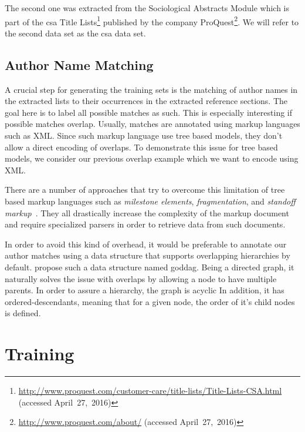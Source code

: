 \bigskip

The second one was extracted from the Sociological Abstracts Module which is part of the \gls{csa} Title Lists\footnote{\url{http://www.proquest.com/customer-care/title-lists/Title-Lists-CSA.html} (accessed April~27,~2016)} published by the company ProQuest\footnote{\url{http://www.proquest.com/about/} (accessed April~27,~2016)}.
We will refer to the second data set as the \gls{csa} data set.


\subsection{Author Name Matching}
A crucial step for generating the training sets is the matching of author names in the extracted lists to their occurrences in the extracted reference sections.
The goal here is to label all possible matches as such.
This is especially interesting if possible matches overlap.
Usually, matches are annotated using markup languages such as XML.
Since such markup language use tree based models, they don't allow a direct encoding of overlaps.
To demonstrate this issue for tree based models, we consider our previous overlap example which we want to encode using XML\@{}.

There are a number of approaches that try to overcome this limitation of tree based markup languages such as \textit{milestone elements}, \textit{fragmentation}, and \textit{standoff markup}~\citep{sperberg2000goddag}. They all drastically increase the complexity of the markup document and require specialized parsers in order to retrieve data from such documents.

In order to avoid this kind of overhead, it would be preferable to annotate our author matches using a data structure that supports overlapping hierarchies by default.
\citet{sperberg2000goddag} propose such a data structure named \acrfull{goddag}.
Being a directed graph, it naturally solves the issue with overlaps by allowing a node to have multiple parents.
In order to assure a hierarchy, the graph is acyclic
In addition, it has ordered-descendants, meaning that for a given node, the order of it's child nodes is defined.







\section{Training }\label{sec:ae-training-crfs}


